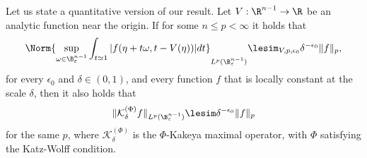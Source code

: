 \documentclass{article}
\numberwithin{equation}{section}
\theoremstyle{plain}
\begin{document}
Let us state a quantitative version of our result. Let $V: \R^{n-1}\to \R$ be an analytic function near the origin. If for some $n\le p< \infty$ it holds that 
\begin{equation}
\Norm{
\sup_{\omega\in \B^{n-1}_{\varepsilon}}
\int_{t\simeq 1} |
f(\eta+ t\omega, t- V(\eta))
| dt
}_{L^p(\B^{n-1}_{\varepsilon})}\lesim_{V, p, \epsilon_0}
\delta^{-\epsilon_0} \|f\|_p,
\end{equation}
for every $\epsilon_0$ and $\delta\in (0, 1)$, and every function $f$ that is locally constant at the scale $\delta$, then it also holds that 
\begin{equation}
\|\mathcal{K}^{(\Phi)}_{\delta}f\|_{L^p(\B^{n-1}_{\varepsilon})} \lesim \delta^{-\epsilon_0} \|f\|_p
\end{equation}
for the same $p$, where $\mathcal{K}^{(\Phi)}_{\delta}$ is the $\Phi$-Kakeya maximal operator, with $\Phi$ satisfying  the Katz-Wolff condition. \\
\end{document}
